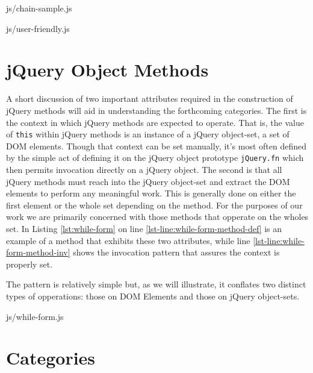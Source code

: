\documentclass[preprint, leqno]{sigplanconf}
\begin{document}
\begin{lstinputlisting}[
    language=JavaScript,
    caption={Sample method chain},
    label={lst:chain-sample}
]{js/chain-sample.js}
\end{lstinputlisting}

\begin{lstinputlisting}[
    language=JavaScript,
    caption={User friendly overhead},
    label={lst:user-friendly}
]{js/user-friendly.js}
\end{lstinputlisting}

\section{jQuery Object Methods}

A short discussion of two important attributes required in the construction of jQuery methods will aid in understanding the forthcoming categories. The first is the context in which jQuery methods are expected to operate. That is, the value of \verb|this| within jQuery methods is an instance of a jQuery object-set, a set of DOM elements. Though that context can be set manually, it's most often defined by the simple act of defining it on the jQuery object prototype \verb|jQuery.fn| which then permits invocation directly on a jQuery object. The second is that all jQuery methods must reach into the jQuery object-set and extract the DOM elements to perform any meaningful work. This is generally done on either the first element or the whole set depending on the method. For the purposes of our work we are primarily concerned with those methods that opperate on the wholes set. In Listing \ref{lst:while-form} on line \ref{lst-line:while-form-method-def} is an example of a method that exhibits these two attributes, while line \ref{lst-line:while-form-method-inv} shows the invocation pattern that assures the context is properly set.

The pattern is relatively simple but, as we will illustrate, it conflates two distinct types of opperations: those on DOM Elements and those on jQuery object-sets.

\begin{lstinputlisting}[
    language=JavaScript,
    caption={Sample jQuery method},
    label={lst:while-form},
    escapeinside={@}{@}
]{js/while-form.js}
\end{lstinputlisting}

\section{Categories}
\end{document}
